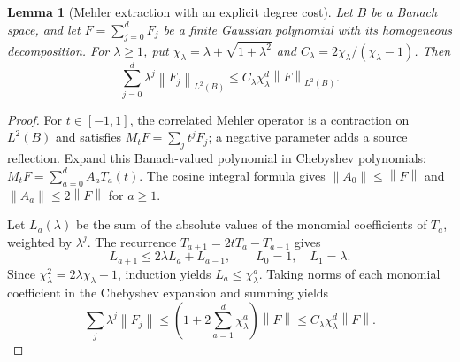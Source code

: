 \documentclass[11pt,a4paper]{amsart}
\numberwithin{equation}{section}
\newtheorem{lemma}[theorem]{Lemma}
\theoremstyle{definition}
\theoremstyle{remark}
\newcommand{\norm}[1]{\left\lVert#1\right\rVert}
\begin{document}
\begin{lemma}[Mehler extraction with an explicit degree cost]\label{lem:chebyshev}
Let $B$ be a Banach space, and let $F=\sum_{j=0}^dF_j$ be a finite Gaussian polynomial with its homogeneous decomposition. For $\lambda\ge1$, put
$\chi_\lambda=\lambda+\sqrt{1+\lambda^2}$ and
$C_\lambda=2\chi_\lambda/(\chi_\lambda-1)$. Then
\begin{equation}\label{eq:chebyshev}
 \sum_{j=0}^d\lambda^j\norm{F_j}_{L^2(B)}
 \le C_\lambda\chi_\lambda^d\norm F_{L^2(B)}.
\end{equation}
\end{lemma}
\begin{proof}
For $t\in[-1,1]$, the correlated Mehler operator is a contraction on $L^2(B)$ and satisfies $M_tF=\sum_jt^jF_j$; a negative parameter adds a source reflection. Expand this Banach-valued polynomial in Chebyshev polynomials:
$M_tF=\sum_{a=0}^dA_aT_a(t)$.
The cosine integral formula gives $\norm{A_0}\le\norm F$ and $\norm{A_a}\le2\norm F$ for $a\ge1$.

Let $L_a(\lambda)$ be the sum of the absolute values of the monomial coefficients of $T_a$, weighted by $\lambda^j$. The recurrence $T_{a+1}=2tT_a-T_{a-1}$ gives
\[
 L_{a+1}\le2\lambda L_a+L_{a-1},\qquad L_0=1,\quad L_1=\lambda.
\]
Since $\chi_\lambda^2=2\lambda\chi_\lambda+1$, induction yields $L_a\le\chi_\lambda^a$. Taking norms of each monomial coefficient in the Chebyshev expansion and summing yields
\[
 \sum_j\lambda^j\norm{F_j}
 \le\left(1+2\sum_{a=1}^d\chi_\lambda^a\right)\norm F
 \le C_\lambda\chi_\lambda^d\norm F.
\]
\end{proof}
\end{document}
